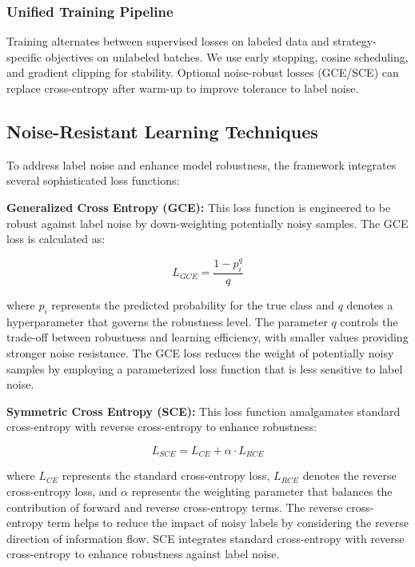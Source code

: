 \documentclass{ieeeaccess}
\begin{document}
\subsubsection{Unified Training Pipeline}
Training alternates between supervised losses on labeled data and strategy-specific objectives on unlabeled batches. We use early stopping, cosine scheduling, and gradient clipping for stability. Optional noise-robust losses (GCE/SCE) can replace cross-entropy after warm-up to improve tolerance to label noise.

\subsection{Noise-Resistant Learning Techniques}
To address label noise and enhance model robustness, the framework integrates several sophisticated loss functions:

\textbf{Generalized Cross Entropy (GCE):} This loss function is engineered to be robust against label noise by down-weighting potentially noisy samples. The GCE loss is calculated as:

\begin{equation}
L_{GCE} = \frac{1 - p_i^q}{q}
\label{eq:gce}
\end{equation}

where $p_i$ represents the predicted probability for the true class and $q$ denotes a hyperparameter that governs the robustness level. The parameter $q$ controls the trade-off between robustness and learning efficiency, with smaller values providing stronger noise resistance. The GCE loss reduces the weight of potentially noisy samples by employing a parameterized loss function that is less sensitive to label noise.

\textbf{Symmetric Cross Entropy (SCE):} This loss function amalgamates standard cross-entropy with reverse cross-entropy to enhance robustness:

\begin{equation}
L_{SCE} = L_{CE} + \alpha \cdot L_{RCE}
\label{eq:sce}
\end{equation}

where $L_{CE}$ represents the standard cross-entropy loss, $L_{RCE}$ denotes the reverse cross-entropy loss, and $\alpha$ represents the weighting parameter that balances the contribution of forward and reverse cross-entropy terms. The reverse cross-entropy term helps to reduce the impact of noisy labels by considering the reverse direction of information flow. SCE integrates standard cross-entropy with reverse cross-entropy to enhance robustness against label noise.
\end{document}
